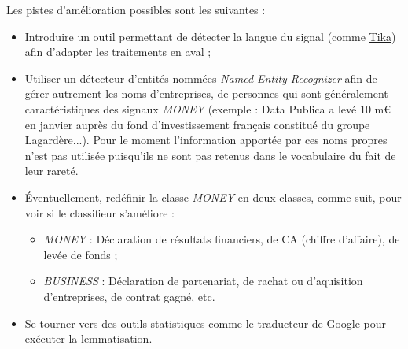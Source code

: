     Les pistes d'amélioration possibles sont les suivantes :
    \begin{itemize}
        \item Introduire un outil permettant de détecter la langue du signal (comme \href{https://tika.apache.org/}{Tika}) afin d'adapter les traitements en aval ;
        \item Utiliser un détecteur d'entités nommées \textit{Named Entity Recognizer} afin de gérer autrement les noms d'entreprises, de personnes qui sont généralement caractéristiques des signaux \textit{MONEY} (exemple : \og Data Publica a levé 10 m€ en janvier auprès du fond d'investissement français constitué du groupe Lagardère...\fg). Pour le moment l'information apportée par ces noms propres n'est pas utilisée puisqu'ils ne sont pas retenus dans le vocabulaire du fait de leur rareté.
        \item Éventuellement, redéfinir la classe \textit{MONEY} en deux classes, comme suit, pour voir si le classifieur s'améliore :
        \begin{itemize}
            \item \textit{MONEY} : Déclaration de résultats financiers, de CA (chiffre d'affaire), de levée de fonds ;
            \item \textit{BUSINESS} : Déclaration de partenariat, de rachat ou d'aquisition d'entreprises, de \og contrat gagné\fg, etc.
        \end{itemize}
        \item Se tourner vers des outils statistiques comme le traducteur de Google pour exécuter la lemmatisation.\\
    \end{itemize}